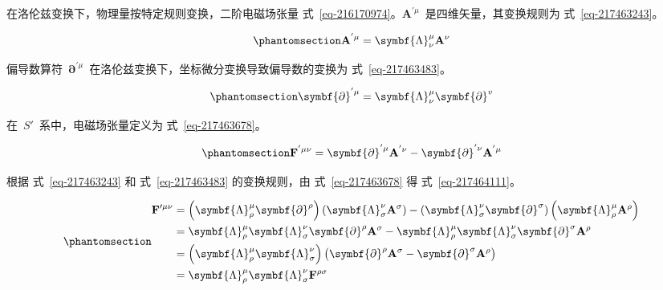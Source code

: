 \documentclass[
  chinese,
  a4paper,
  UTF8,
  12pt,
  oneside,
  openany]{ctexbook}
\begin{document}
在洛伦兹变换下，物理量按特定规则变换，二阶电磁场张量
式~\ref{eq-216170974}。\(\mathbf{A}^{'\mu}\)~是四维矢量，其变换规则为
式~\ref{eq-217463243}。

\begin{equation}\protect\phantomsection\label{eq-217463243}{
\mathbf{A}^{'\mu} = \symbf{\Lambda}_{\nu}^{\mu}\mathbf{A}^{\nu}
}\end{equation}

偏导数算符~\(\symbf{\partial}^{'\mu}\)~在洛伦兹变换下，坐标微分变换导致偏导数的变换为
式~\ref{eq-217463483}。

\begin{equation}\protect\phantomsection\label{eq-217463483}{
\symbf{\partial}^{'\mu} = \symbf{\Lambda}_{\nu}^{\mu}\symbf{\partial}^{v}
}\end{equation}

在~\(S'\)~系中，电磁场张量定义为 式~\ref{eq-217463678}。

\begin{equation}\protect\phantomsection\label{eq-217463678}{
\mathbf{F}^{'\mu\nu} = \symbf{\partial}^{'\mu}\mathbf{A}^{'\nu} - \symbf{\partial}^{'\nu}\mathbf{A}^{'\mu}
}\end{equation}

根据 式~\ref{eq-217463243} 和 式~\ref{eq-217463483} 的变换规则，由
式~\ref{eq-217463678} 得 式~\ref{eq-217464111}。

\begin{equation}\protect\phantomsection\label{eq-217464111}{
\begin{aligned}
\mathbf{F}'^{\mu\nu}
&= \left( \symbf{\Lambda}_{\rho}^{\mu}\symbf{\partial}^{\rho} \right)\left( \symbf{\Lambda}_{\sigma}^{\nu}\mathbf{A}^{\sigma} \right)
- \left( \symbf{\Lambda}_{\sigma}^{\nu}\symbf{\partial}^{\sigma} \right)\left( \symbf{\Lambda}_{\rho}^{\mu}\mathbf{A}^{\rho} \right) \\
&= \symbf{\Lambda}_{\rho}^{\mu}\symbf{\Lambda}_{\sigma}^{\nu}\symbf{\partial}^{\rho}\mathbf{A}^{\sigma}
- \symbf{\Lambda}_{\rho}^{\mu}\symbf{\Lambda}_{\sigma}^{\nu}\symbf{\partial}^{\sigma}\mathbf{A}^{\rho} \\
&= \left( \symbf{\Lambda}_{\rho}^{\mu}\symbf{\Lambda}_{\sigma}^{\nu} \right)
\bigl( \symbf{\partial}^{\rho}\mathbf{A}^{\sigma} - \symbf{\partial}^{\sigma}\mathbf{A}^{\rho} \bigr) \\
&= \symbf{\Lambda}_{\rho}^{\mu}\symbf{\Lambda}_{\sigma}^{\nu}\mathbf{F}^{\rho\sigma}
\end{aligned}
}\end{equation}
\end{document}
